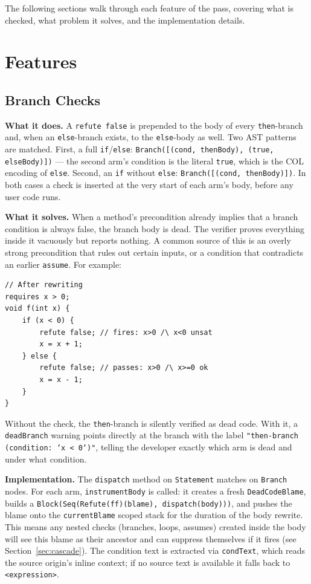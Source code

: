 \documentclass[9pt,a4paper,twocolumn]{article}
\begin{document}
The following sections walk through each feature of the pass,
covering what is checked, what problem it solves, and the
implementation details.

\section{Features}

\subsection{Branch Checks}

\textbf{What it does.} A \texttt{refute false} is prepended to
the body of every \texttt{then}-branch and, when an
\texttt{else}-branch exists, to the \texttt{else}-body as well.
Two AST patterns are matched. First, a full
\texttt{if}/\texttt{else}: \texttt{Branch([(cond, thenBody),
(true, elseBody)])} — the second arm's condition is the literal
\texttt{true}, which is the COL encoding of \texttt{else}. Second,
an \texttt{if} without \texttt{else}: \texttt{Branch([(cond,
thenBody)])}. In both cases a check is inserted at the very start
of each arm's body, before any user code runs.

\textbf{What it solves.} When a method's precondition already
implies that a branch condition is always false, the branch body
is dead. The verifier proves everything inside it vacuously but
reports nothing. A common source of this is an overly strong
precondition that rules out certain inputs, or a condition that
contradicts an earlier \texttt{assume}. For example:

\begin{lstlisting}
// After rewriting
requires x > 0;
void f(int x) {
    if (x < 0) {
        refute false; // fires: x>0 /\ x<0 unsat
        x = x + 1;
    } else {
        refute false; // passes: x>0 /\ x>=0 ok
        x = x - 1;
    }
}
\end{lstlisting}

Without the check, the \texttt{then}-branch is silently verified
as dead code. With it, a \texttt{deadBranch} warning points
directly at the branch with the label
\texttt{"then-branch (condition: `x < 0`)"}, telling the developer
exactly which arm is dead and under what condition.

\textbf{Implementation.} The \texttt{dispatch} method on
\texttt{Statement} matches on \texttt{Branch} nodes. For each arm,
\texttt{instrumentBody} is called: it creates a fresh
\texttt{DeadCodeBlame}, builds a
\texttt{Block(Seq(Refute(ff)(blame), dispatch(body)))}, and pushes
the blame onto the \texttt{currentBlame} scoped stack for the
duration of the body rewrite. This means any nested checks
(branches, loops, assumes) created inside the body will see this
blame as their ancestor and can suppress themselves if it fires
(see Section~\ref{sec:cascade}). The condition text is extracted
via \texttt{condText}, which reads the source origin's inline
context; if no source text is available it falls back to
\texttt{<expression>}.
\end{document}
